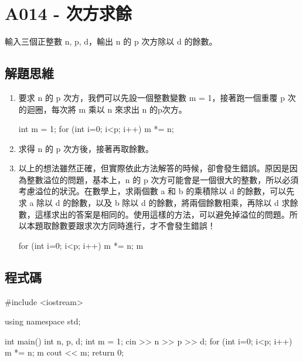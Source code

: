 \section{A014 - 次方求餘}
輸入三個正整數 n, p, d，輸出 n 的 p 次方除以 d 的餘數。
\subsection{解題思維}
\begin{enumerate}
\item 要求 n 的 p 次方，我們可以先設一個整數變數 m = 1，接著跑一個重覆 p 次的迴圈，每次將 m 乘以 n 來求出 n 的p次方。
	\begin{inside}
	int m = 1;
	for (int i=0; i<p; i++) m *= n;
	\end{inside}
\item 求得 n 的 p 次方後，接著再取餘數。
\item 以上的想法雖然正確，但實際依此方法解答的時候，卻會發生錯誤。原因是因為整數溢位的問題，基本上，n 的 p 次方可能會是一個很大的整數，所以必須考慮溢位的狀況。在數學上，求兩個數 a 和 b 的乘積除以 d 的餘數，可以先求 a 除以 d 的餘數，以及 b 除以 d 的餘數，將兩個餘數相乘，再除以 d 求餘數，這樣求出的答案是相同的。使用這樣的方法，可以避免掉溢位的問題。所以本題取餘數要跟求次方同時進行，才不會發生錯誤！
	\begin{inside}
	for (int i=0; i<p; i++) { 
		m *= n;
		m %
	}
	\end{inside}	
\end{enumerate}

\subsection{程式碼}
\begin{cppcode}
	#include <iostream>
	
	using namespace std;
	
	int main()
	{
		int n, p, d;
		int m = 1;
		cin >> n >> p >> d;
		for (int i=0; i<p; i++) {
			m *= n;
			m %
		}
		cout << m;
		return 0;
	}
\end{cppcode}

